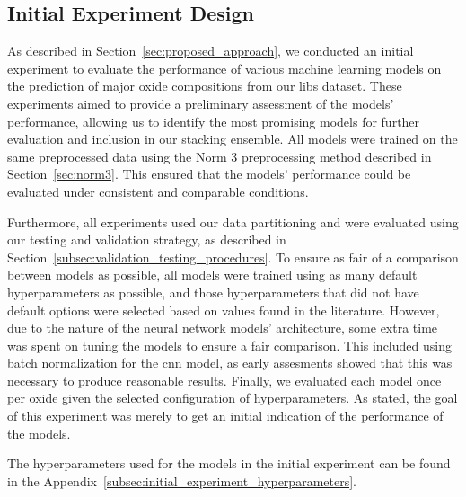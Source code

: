 \subsection{Initial Experiment Design}\label{sec:initial-experiment}
As described in Section~\ref{sec:proposed_approach}, we conducted an initial experiment to evaluate the performance of various machine learning models on the prediction of major oxide compositions from our \gls{libs} dataset.
These experiments aimed to provide a preliminary assessment of the models' performance, allowing us to identify the most promising models for further evaluation and inclusion in our stacking ensemble.
All models were trained on the same preprocessed data using the Norm 3 preprocessing method described in Section~\ref{sec:norm3}.
This ensured that the models' performance could be evaluated under consistent and comparable conditions.

Furthermore, all experiments used our data partitioning and were evaluated using our testing and validation strategy, as described in Section~\ref{subsec:validation_testing_procedures}.
To ensure as fair of a comparison between models as possible, all models were trained using as many default hyperparameters as possible, and those hyperparameters that did not have default options were selected based on values found in the literature.
However, due to the nature of the neural network models' architecture, some extra time was spent on tuning the models to ensure a fair comparison.
This included using batch normalization for the \gls{cnn} model, as early assesments showed that this was necessary to produce reasonable results.
Finally, we evaluated each model once per oxide given the selected configuration of hyperparameters.
As stated, the goal of this experiment was merely to get an initial indication of the performance of the models.

The hyperparameters used for the models in the initial experiment can be found in the Appendix~\ref{subsec:initial_experiment_hyperparameters}.